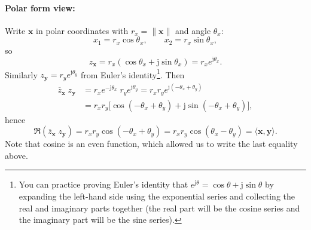 \paragraph{Polar form view:}
Write $\mathbf{x}$ in polar coordinates with $r_x=\|\mathbf{x}\|$ and angle
$\theta_x$:
\[
x_1=r_x\cos\theta_x,\qquad x_2=r_x\sin\theta_x,
\]
so
\[
z_{\mathbf{x}}=r_x(\cos\theta_x+\mathrm{j}\sin\theta_x)=r_x e^{\mathrm{j}\theta_x}.
\]
Similarly $z_{\mathbf{y}}=r_y e^{\mathrm{j}\theta_y}$ from Euler's identity\footnote{You can practice proving Euler's identity that $e^{\mathrm{j}\theta}=\cos\theta+\mathrm{j}\sin\theta$ by expanding the left-hand side using the exponential series and collecting the real and imaginary parts together (the real part will be the cosine series and the imaginary part will be the sine series).}. Then
\begin{align*}
\overline{z}_{\mathbf{x}}\;z_{\mathbf{y}}
&= r_x e^{-\mathrm{j}\theta_x}\; r_y e^{\mathrm{j}\theta_y}
= r_x r_y e^{\mathrm{j}(-\theta_x+\theta_y)} \\
&= r_x r_y\Big[\cos(-\theta_x+\theta_y)
  + \mathrm{j}\sin(-\theta_x+\theta_y)\Big],
\end{align*}
hence
\[
\Re\!\left(\overline{z}_{\mathbf{x}}\;z_{\mathbf{y}}\right)
= r_x r_y \cos(-\theta_x+\theta_y) = r_x r_y \cos(\theta_x - \theta_y)
= \langle \mathbf{x},\mathbf{y}\rangle .
\]
Note that cosine is an even function, which allowed us to write the last equality above. 
